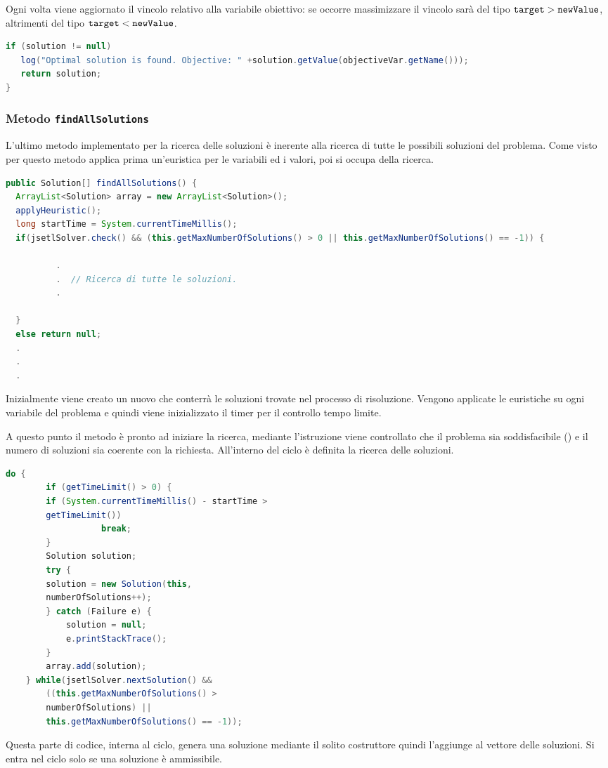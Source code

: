 Ogni volta viene aggiornato il vincolo relativo alla variabile obiettivo: se
occorre massimizzare il vincolo sarà del tipo $\texttt{target} > 
\texttt{newValue}$,
altrimenti del tipo  $\texttt{target} < \texttt{newValue}$.
\begin{lstlisting}[language = Java,
                   caption = {\files{findOptimalSolution}, termine.}
                  ]
if (solution != null)
   log("Optimal solution is found. Objective: " +solution.getValue(objectiveVar.getName()));
   return solution;
}
\end{lstlisting}

\subsubsection{Metodo \texttt{findAllSolutions}}
L'ultimo metodo implementato per la ricerca delle soluzioni è inerente alla
ricerca di tutte le possibili soluzioni del problema. Come visto per
 questo metodo applica prima un'euristica per le
variabili ed i valori, poi si occupa della ricerca.

\begin{lstlisting}[language = Java,
                   caption = {\files{findAllSolutions}, inizializzazione.}
                  ]
public Solution[] findAllSolutions() {
  ArrayList<Solution> array = new ArrayList<Solution>();
  applyHeuristic();
  long startTime = System.currentTimeMillis();
  if(jsetlSolver.check() && (this.getMaxNumberOfSolutions() > 0 || this.getMaxNumberOfSolutions() == -1)) {
    
          .
          .  // Ricerca di tutte le soluzioni.
          .
    
  }
  else return null;
  .
  .
  .
\end{lstlisting}
Inizialmente viene creato un nuovo  che conterrà le soluzioni
trovate nel processo di risoluzione. Vengono applicate le euristiche su ogni
variabile del problema e quindi viene inizializzato il timer per il controllo
tempo limite.

A questo punto il metodo è pronto ad iniziare la ricerca, mediante l'istruzione 
 viene controllato che il problema sia soddisfacibile 
() e il numero
di soluzioni sia coerente con la richiesta. All'interno del ciclo 
è definita la ricerca delle soluzioni.

\begin{lstlisting}[language = Java,
                   caption = {\files{findAllSolutions}, ricerca.}
                  ]
	do { 
	    if (getTimeLimit() > 0) {
		if (System.currentTimeMillis() - startTime > 
		getTimeLimit())
                   break;				
	    }
	    Solution solution;
	    try {
		solution = new Solution(this, 
		numberOfSolutions++);
	    } catch (Failure e) {
	        solution = null;
	        e.printStackTrace();
	    }
	    array.add(solution);
	} while(jsetlSolver.nextSolution() && 
		((this.getMaxNumberOfSolutions() > 
		numberOfSolutions) ||
		this.getMaxNumberOfSolutions() == -1));
\end{lstlisting}
Questa parte di codice, interna al ciclo, genera una soluzione mediante il
solito costruttore quindi l'aggiunge al vettore delle soluzioni. Si entra nel 
ciclo solo se una soluzione è ammissibile.

